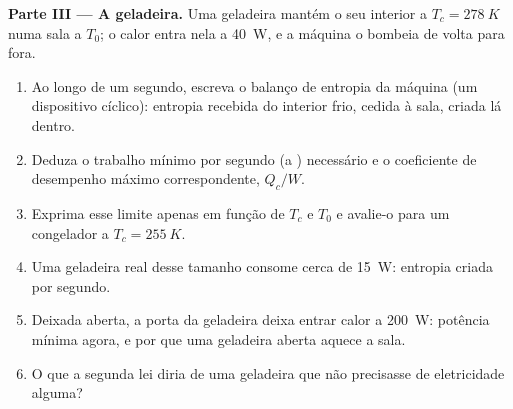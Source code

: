 \begin{problem}
\medskip
\noindent\textbf{Parte III --- A geladeira.}
Uma geladeira mantém o seu interior a $T_c = \qty{278}{K}$ numa sala a
$T_0$; o calor entra nela a \qty{40}{W}, e a máquina o bombeia de volta para fora.
\begin{enumerate}[resume]
  \item Ao longo de um segundo, escreva o balanço de entropia da máquina
        (um dispositivo cíclico): entropia recebida do interior frio,
        cedida à sala, criada lá dentro.
  \item Deduza o trabalho mínimo por segundo (a )
        necessário e o coeficiente de desempenho máximo correspondente,
        $Q_c/W$.
  \item Exprima esse limite apenas em função de $T_c$ e $T_0$ e avalie-o
        para um congelador a $T_c = \qty{255}{K}$.
  \item Uma geladeira real desse tamanho consome cerca de \qty{15}{W}:
        entropia criada por segundo.
  \item Deixada aberta, a porta da geladeira deixa entrar calor a
        \qty{200}{W}: potência mínima agora, e por que uma geladeira aberta
        aquece a sala.
  \item O que a segunda lei diria de uma geladeira que não precisasse de
        eletricidade alguma?
\end{enumerate}


\end{problem}
